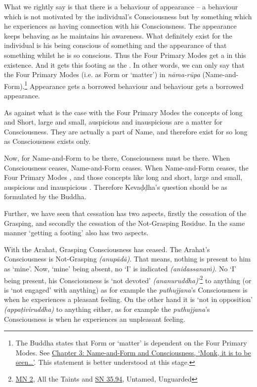 What we  rightly say is that there is a behaviour of appearance -- a behaviour which is not motivated by the individual's Consciousness but by something which he experiences as having  connection with his Consciousness. The appearance keeps behaving as he maintains his awareness. What  definitely exist for the individual is his being conscious of something and the appearance of that something whilst he is so conscious. Thus the Four Primary Modes get a  in this existence. And it gets this footing as the . In other words, we can only say that the Four Primary Modes  (i.e. as Form or `matter') in \emph{nāma-rūpa} (Name-and-Form).\footnote{The Buddha states that Form or `matter' is dependent on the Four Primary Modes. See \href{ch-03-name-and-form-and-consciousness.xml\#dependent}{Chapter 3: Name-and-Form and Consciousness, `Monk, it is to be seen\ldots\hspace{0pt}'}. This statement is better understood at this stage.} Appearance gets a borrowed behaviour and behaviour gets a borrowed appearance.

As against what is the case with the Four Primary Modes the concepts of long and Short, large and small, auspicious and inauspicious are  a matter for Consciousness. They are actually a part of Name, and therefore exist for so long as Consciousness exists only.

Now, for Name-and-Form to be there, Consciousness must be there. When Consciousness ceases, Name-and-Form ceases. When Name-and-Form ceases, the Four Primary Modes , and those concepts like long and short, large and small, auspicious and inauspicious . Therefore Kevaḍḍha's question should be as formulated by the Buddha.

Further, we have seen that cessation has two aspects, firstly the cessation of the Grasping, and secondly the cessation of the Not-Grasping Residue. In the same manner `getting a footing' also has two aspects.

With the Arahat, Grasping Consciousness has ceased. The Arahat's Consciousness is Not-Grasping \emph{(anupādā)}. That means, nothing is present to him as `mine'. Now, `mine' being absent, no `I' is indicated \emph{(anidassanaṁ)}. No `I' being present, his Consciousness is `not devoted' \emph{(ananuruddha)}'\footnote{\href{https://suttacentral.net/mn2/en/bodhi}{MN 2}, All the Taints and \href{https://suttacentral.net/sn35.94/en/bodhi}{SN 35.94}, Untamed, Unguarded} to anything (or is `not engaged' with anything) as for example the \emph{puthujjana}'s Consciousness is when he experiences a pleasant feeling. On the other hand it is `not in opposition' \emph{(appaṭiviruddha)} to anything either, as for example the \emph{puthujjana}'s Consciousness is when he experiences an unpleasant feeling.

